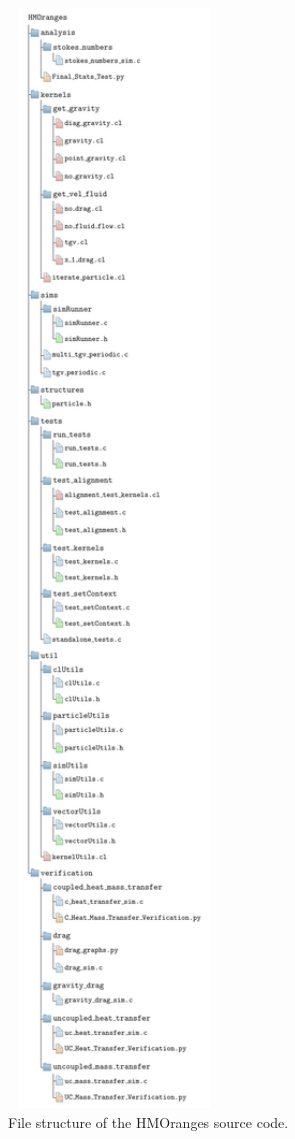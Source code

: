 \documentclass[../Interim_Report_Master]{subfiles}
\begin{document}
\begin{figure}
	\centering
	\includegraphics*[width=0.5\textwidth, trim=0 0 0 1025, clip]{./Diagrams/HMOranges_Structure/HMOranges_Structure.pdf}
	\caption{File structure of the HMOranges source code.}
	\label{hmorange_struct}
\end{figure}
\end{document}
